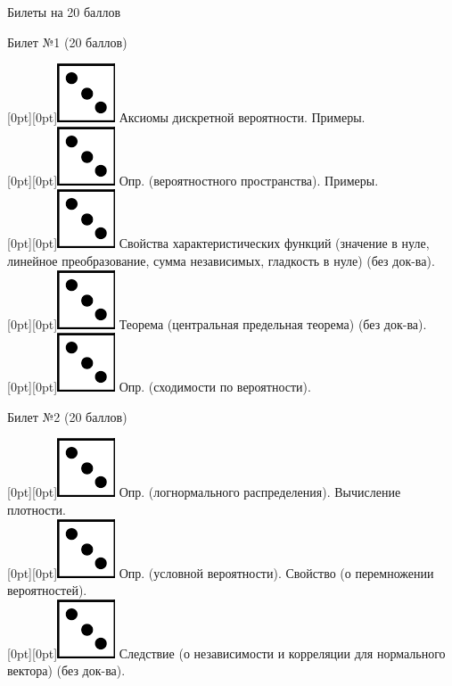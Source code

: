 \documentclass[preview]{standalone}
\begin{document}
\thispagestyle{empty}

\begin{center}
    Билеты на 20 баллов
\end{center}
\begin{center} {\Large Билет №1 (20 баллов)} \end{center}
\raisebox{-1pt}[0pt][0pt]{\includegraphics[width=0.02\linewidth]{3.png}} Аксиомы дискретной вероятности. Примеры. \\
\raisebox{-1pt}[0pt][0pt]{\includegraphics[width=0.02\linewidth]{3.png}} Опр. (вероятностного пространства). Примеры. \\
\raisebox{-1pt}[0pt][0pt]{\includegraphics[width=0.02\linewidth]{3.png}} Свойства характеристических функций (значение в нуле, линейное преобразование, сумма независимых, гладкость в нуле) (без док-ва). \\
\raisebox{-1pt}[0pt][0pt]{\includegraphics[width=0.02\linewidth]{3.png}} Теорема (центральная предельная теорема) (без док-ва). \\
\raisebox{-1pt}[0pt][0pt]{\includegraphics[width=0.02\linewidth]{3.png}} Опр. (сходимости по вероятности). \\
\begin{center} {\Large Билет №2 (20 баллов)} \end{center}
\raisebox{-1pt}[0pt][0pt]{\includegraphics[width=0.02\linewidth]{3.png}} Опр. (логнормального распределения). Вычисление плотности. \\
\raisebox{-1pt}[0pt][0pt]{\includegraphics[width=0.02\linewidth]{3.png}} Опр. (условной вероятности).  Свойство (о перемножении вероятностей). \\ 
\raisebox{-1pt}[0pt][0pt]{\includegraphics[width=0.02\linewidth]{3.png}} Следствие (о независимости и корреляции для нормального вектора) (без док-ва). \\ 
\end{document}
